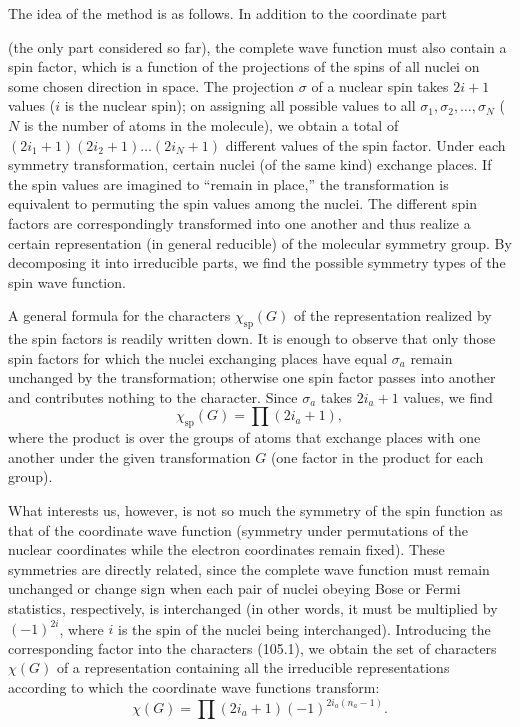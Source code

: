 The idea of the method is as follows. In addition to the coordinate part

(the only part considered so far), the complete wave function must also contain a spin factor, which is a function of the projections of the spins of all nuclei on some chosen direction in space. The projection $\sigma$ of a nuclear spin takes $2i+1$ values ($i$ is the nuclear spin); on assigning all possible values to all $\sigma_1,\sigma_2,\ldots,\sigma_N$ ($N$ is the number of atoms in the molecule), we obtain a total of $(2i_1+1)(2i_2+1)\ldots(2i_N+1)$ different values of the spin factor. Under each symmetry transformation, certain nuclei (of the same kind) exchange places. If the spin values are imagined to ``remain in place,'' the transformation is equivalent to permuting the spin values among the nuclei. The different spin factors are correspondingly transformed into one another and thus realize a certain representation (in general reducible) of the molecular symmetry group. By decomposing it into irreducible parts, we find the possible symmetry types of the spin wave function.

A general formula for the characters $\chi_{\mathrm{sp}}(G)$ of the representation realized by the spin factors is readily written down. It is enough to observe that only those spin factors for which the nuclei exchanging places have equal $\sigma_a$ remain unchanged by the transformation; otherwise one spin factor passes into another and contributes nothing to the character. Since $\sigma_a$ takes $2i_a+1$ values, we find
\begin{equation}
 \chi_{\mathrm{sp}}(G)=\prod(2i_a+1), \tag{105.1}
\end{equation}
where the product is over the groups of atoms that exchange places with one another under the given transformation $G$ (one factor in the product for each group).

What interests us, however, is not so much the symmetry of the spin function as that of the coordinate wave function (symmetry under permutations of the nuclear coordinates while the electron coordinates remain fixed). These symmetries are directly related, since the complete wave function must remain unchanged or change sign when each pair of nuclei obeying Bose or Fermi statistics, respectively, is interchanged (in other words, it must be multiplied by $(-1)^{2i}$, where $i$ is the spin of the nuclei being interchanged). Introducing the corresponding factor into the characters (105.1), we obtain the set of characters $\chi(G)$ of a representation containing all the irreducible representations according to which the coordinate wave functions transform:
\begin{equation}
 \chi(G)=\prod(2i_a+1)(-1)^{2i_a(n_a-1)}. \tag{105.2}
\end{equation}

